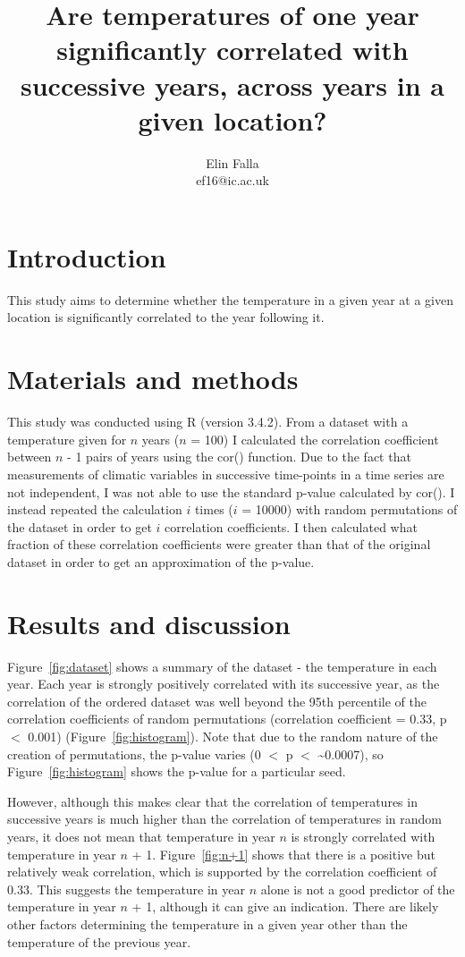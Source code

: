\documentclass[12pt]{article}
\title{Are temperatures of one year significantly correlated with successive years, across years in a given location?}
\author{Elin Falla\\ef16@ic.ac.uk}
\begin{document}
	\maketitle
	
	\section{Introduction}
		This study aims to determine whether the temperature in a given year at a given location is significantly correlated to the year following it.
		
	\section{Materials and methods}
		This study was conducted using R (version 3.4.2). From a dataset with a temperature given for $n$ years ($n$ = 100) I calculated the correlation coefficient between $n$ - 1 pairs of years using the cor() function. Due to the fact that measurements of climatic variables in successive time-points in a time series are not independent, I was not able to use the standard p-value calculated by cor(). I instead repeated the calculation $i$ times ($i$ = 10000) with random permutations of the dataset in order to get $i$ correlation coefficients. I then calculated what fraction of these correlation coefficients were greater than that of the original dataset in order to get an approximation of the p-value.

	\section{Results and discussion}
		Figure~\ref{fig:dataset} shows a summary of the dataset - the temperature in each year. Each year is strongly positively correlated with its successive year, as the correlation of the ordered dataset was well beyond the 95th percentile of the correlation coefficients of random permutations (correlation coefficient = 0.33, p $<$ 0.001) (Figure~\ref{fig:histogram}). Note that due to the random nature of the creation of permutations, the p-value varies (0 $<$ p $<$ \textasciitilde 0.0007), so Figure~\ref{fig:histogram} shows the p-value for a particular seed.
		
		However, although this makes clear that the correlation of temperatures in successive years is much higher than the correlation of temperatures in random years, it does not mean that temperature in year $n$ is strongly correlated with temperature in year $n$ + 1. Figure~\ref{fig:n+1} shows that there is a positive but relatively weak correlation, which is supported by the correlation coefficient of 0.33. This suggests the temperature in year $n$ alone is not a good predictor of the temperature in year $n$ + 1, although it can give an indication. There are likely other factors determining the temperature in a given year other than the temperature of the previous year.
		
\end{document}
